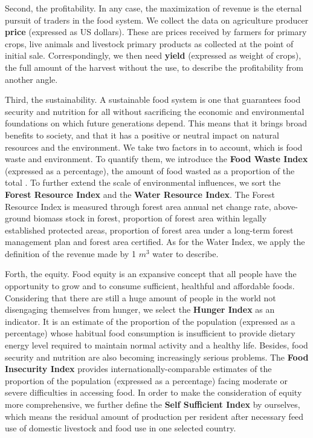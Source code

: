 \documentclass{mcmthesis}
\begin{document}
Second, the profitability. In any case, the maximization of revenue is the eternal pursuit of traders in the food system. We collect the data on agriculture producer \textbf{price} (expressed as US dollars). These are prices received by farmers for primary crops, live animals and livestock primary products as collected at the point of initial sale\cite{price}. Correspondingly, we then need \textbf{yield} (expressed as weight of crops), the full amount of the harvest without the use, to describe the profitability from another angle. 
 
Third, the sustainability. A sustainable food system is one that guarantees food security and nutrition for all without sacrificing the economic and environmental foundations on which future generations depend. This means that it brings broad benefits to society, and that it has a positive or neutral impact on natural resources and the environment. We take two factors in to account, which is food waste and environment. To quantify them, we introduce the\textbf{ Food Waste Index} (expressed as a percentage), the amount of food wasted as a proportion of the total \cite{loss}. To further extend the scale of environmental influences, we sort the \textbf{Forest Resource Index} and the \textbf{Water Resource Index}. The Forest Resource Index is measured through forest area annual net change rate, above-ground biomass stock in forest, proportion of forest area within legally established protected areas, proportion of forest area under a long-term
forest management plan and forest area certified\cite{Forest}. As for the Water Index, we apply the definition of the revenue made by 1 $m^3$ water to describe\cite{water}.

Forth, the equity. Food equity is an expansive concept that all people have the opportunity to grow and to consume sufficient, healthful and affordable foods\cite{food_equity}. Considering that there are still a huge amount of people in the world not disengaging themselves from hunger, we select the \textbf{Hunger Index} as an indicator. It is an estimate of the proportion of the population (expressed as a percentage) whose habitual food consumption is insufficient to provide dietary energy level required to maintain normal activity and a healthy life\cite{hunger_index}. Besides, food security and nutrition are also becoming increasingly serious problems. The \textbf{Food Insecurity Index} provides internationally-comparable estimates of the proportion of the population (expressed as a percentage) facing moderate or severe difficulties in accessing food\cite{insecurity_index}. In order to make the consideration of equity more comprehensive, we further define the \textbf{Self Sufficient Index} by ourselves, which means the residual amount of production per resident after necessary feed use of domestic livestock and food use in one selected country.
\end{document}

